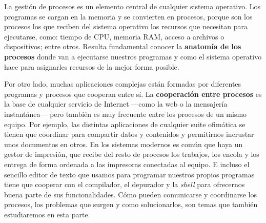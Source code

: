 La gestión de procesos es un elemento central de cualquier sistema
operativo. Los programas se cargan en la memoria y se convierten en
procesos, porque son los procesos los que reciben del sistema operativo
los recursos que necesitan para ejecutarse, como: tiempo de CPU, memoria
RAM, acceso a archivos o dispositivos; entre otros. Resulta fundamental
conocer la \textbf{anatomía de los procesos} donde van a ejecutarse
nuestros programas y como el sistema operativo hace para asignarles
recursos de la mejor forma posible.

Por otro lado, muchas aplicaciones complejas están formadas por
diferentes programas y procesos que cooperan entre sí. La
\textbf{cooperación entre procesos} es la base de cualquier servicio de
Internet ---como la web o la mensajería instantánea--- pero también es
muy frecuente entre los procesos de un mismo equipo. Por ejemplo, las
distintas aplicaciones de cualquier suite ofimática se tienen que
coordinar para compartir datos y contenidos y permitirnos incrustar unos
documentos en otros. En los sistemas modernos es común que haya un
gestor de impresión, que recibe del resto de procesos los trabajos, los
encola y los entrega de forma ordenada a las impresoras conectadas al
equipo. E incluso el sencillo editor de texto que usamos para programar
nuestros propios programas tiene que cooperar con el compilador, el
depurador y la \emph{shell} para ofrecernos buena parte de sus
funcionalidades. Cómo pueden comunicarse y coordinarse los procesos, los
problemas que surgen y como solucionarlos, son temas que también
estudiaremos en esta parte.
